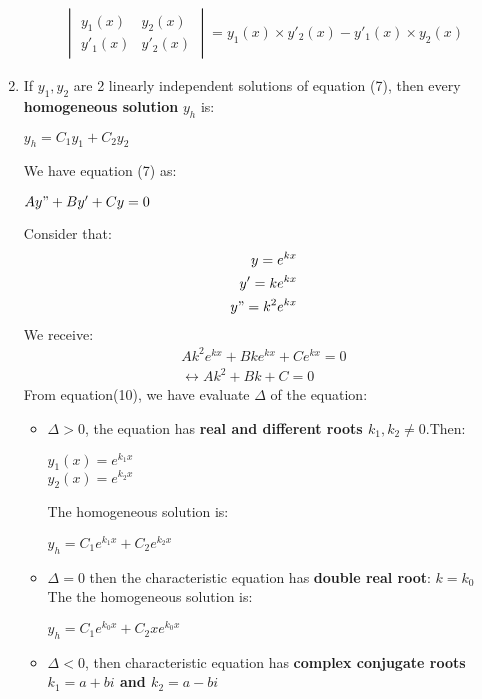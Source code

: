 \documentclass[10pt]{article}
\begin{document}
\begin{enumerate}
\begin{center}
\begin{align*}
\begin{vmatrix}
	y_1(x) & y_2(x)\\
	y'_1(x) & y'_2(x)
	\end{vmatrix}
	= y_1(x) \times y'_2(x) - y'_1(x) \times y_2(x)
	\end{align*}
	\end{center}
	\item If $y_1,y_2$ are 2 linearly independent solutions of equation (7), then every \textbf{homogeneous solution} \textit{$y_h$} is:
	\begin{center}
	$y_h = C_1y_1 + C_2y_2$
	\end{center}
	We have equation (7) as:
	\begin{center}
	$Ay" + By' + Cy = 0$
	\end{center}
	Consider that:
	\begin{align*}
	y = e^{kx}\\
	y' = ke^{kx}\\
	y" = k^2e^{kx}
	\end{align*}
	We receive:
	\begin{align}
	Ak^2e^{kx} + Bke^{kx} + Ce^{kx} = 0\\
	\leftrightarrow{Ak^2 + Bk + C = 0}
	\end{align}
	From equation(10), we have evaluate $\Delta$ of the equation:
	\begin{itemize}
		\item $\Delta > 0$, the equation has \textbf{real and different roots $k_1,k_2 \not = 0$}.Then:
		\begin{center}
		$y_1(x) = e^{k_1x}$\\
		$y_2(x) = e^{k_2x}$
		\end{center}
		The homogeneous solution is:
		\begin{mybox}
		\begin{center}
		 $y_h = C_1e^{k_1x} + C_2e^{k_2x}$
		 \end{center}
		 \end{mybox}
		 \item $\Delta = 0$ then the characteristic equation has \textbf{double real root}: $k = k_{0}$\\
		 The the homogeneous solution is:
		 \begin{mybox}
		 \begin{center}
		 $y_h = C_1e^{k_0x} + C_2xe^{k_0x}$
		 \end{center}
		 \end{mybox}
		 \item $\Delta < 0$, then characteristic equation has \textbf{complex conjugate roots $k_1 = a + bi$ and $k_2 = a - bi$}\\

\end{itemize}
\end{enumerate}
\end{document}

